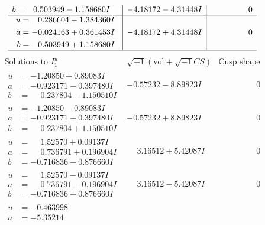 \documentclass[1p]{elsarticle_modified}
\theoremstyle{definition}
\newcommand{\I}{\sqrt{-1}}
\begin{document}
$$\begin{array}{c|c|c}
\begin{aligned}
b &= \phantom{-}0.503949 - 1.158680 I\end{aligned}
 & -4.18172 - 4.31448 I & \phantom{-0.000000 } 0 \\ \hline\begin{aligned}
u &= \phantom{-}0.286604 - 1.384360 I \\
a &= -0.024163 + 0.361453 I \\
b &= \phantom{-}0.503949 + 1.158680 I\end{aligned}
 & -4.18172 + 4.31448 I & \phantom{-0.000000 } 0\\
 \hline 
 \end{array}$$\newpage$$\begin{array}{c|c|c}  
\text{Solutions to }I^u_{1}& \I (\text{vol} + \sqrt{-1}CS) & \text{Cusp shape}\\
 \hline 
\begin{aligned}
u &= -1.20850 + 0.89083 I \\
a &= -0.923171 - 0.397480 I \\
b &= \phantom{-}0.237804 - 1.150510 I\end{aligned}
 & -0.57232 - 8.89823 I & \phantom{-0.000000 } 0 \\ \hline\begin{aligned}
u &= -1.20850 - 0.89083 I \\
a &= -0.923171 + 0.397480 I \\
b &= \phantom{-}0.237804 + 1.150510 I\end{aligned}
 & -0.57232 + 8.89823 I & \phantom{-0.000000 } 0 \\ \hline\begin{aligned}
u &= \phantom{-}1.52570 + 0.09137 I \\
a &= \phantom{-}0.736791 + 0.196904 I \\
b &= -0.716836 - 0.876660 I\end{aligned}
 & \phantom{-}3.16512 + 5.42087 I & \phantom{-0.000000 } 0 \\ \hline\begin{aligned}
u &= \phantom{-}1.52570 - 0.09137 I \\
a &= \phantom{-}0.736791 - 0.196904 I \\
b &= -0.716836 + 0.876660 I\end{aligned}
 & \phantom{-}3.16512 - 5.42087 I & \phantom{-0.000000 } 0 \\ \hline\begin{aligned}
u &= -0.463998\phantom{ +0.000000I} \\
a &= -5.35214\phantom{ +0.000000I} \\

\end{aligned}
\end{array}$$
\end{document}
